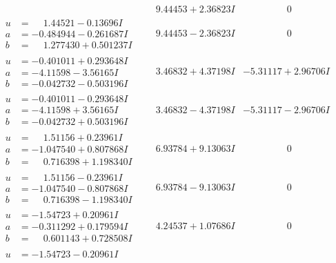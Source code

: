 \documentclass[1p]{elsarticle_modified}
\theoremstyle{definition}
\begin{document}
$$\begin{array}{c|c|c}
 & \phantom{-}9.44453 + 2.36823 I & \phantom{-0.000000 } 0 \\ \hline\begin{aligned}
u &= \phantom{-}1.44521 - 0.13696 I \\
a &= -0.484944 - 0.261687 I \\
b &= \phantom{-}1.277430 + 0.501237 I\end{aligned}
 & \phantom{-}9.44453 - 2.36823 I & \phantom{-0.000000 } 0 \\ \hline\begin{aligned}
u &= -0.401011 + 0.293648 I \\
a &= -4.11598 - 3.56165 I \\
b &= -0.042732 - 0.503196 I\end{aligned}
 & \phantom{-}3.46832 + 4.37198 I & -5.31117 + 2.96706 I \\ \hline\begin{aligned}
u &= -0.401011 - 0.293648 I \\
a &= -4.11598 + 3.56165 I \\
b &= -0.042732 + 0.503196 I\end{aligned}
 & \phantom{-}3.46832 - 4.37198 I & -5.31117 - 2.96706 I \\ \hline\begin{aligned}
u &= \phantom{-}1.51156 + 0.23961 I \\
a &= -1.047540 + 0.807868 I \\
b &= \phantom{-}0.716398 + 1.198340 I\end{aligned}
 & \phantom{-}6.93784 + 9.13063 I & \phantom{-0.000000 } 0 \\ \hline\begin{aligned}
u &= \phantom{-}1.51156 - 0.23961 I \\
a &= -1.047540 - 0.807868 I \\
b &= \phantom{-}0.716398 - 1.198340 I\end{aligned}
 & \phantom{-}6.93784 - 9.13063 I & \phantom{-0.000000 } 0 \\ \hline\begin{aligned}
u &= -1.54723 + 0.20961 I \\
a &= -0.311292 + 0.179594 I \\
b &= \phantom{-}0.601143 + 0.728508 I\end{aligned}
 & \phantom{-}4.24537 + 1.07686 I & \phantom{-0.000000 } 0 \\ \hline\begin{aligned}
u &= -1.54723 - 0.20961 I \\

\end{aligned}
\end{array}$$
\end{document}

